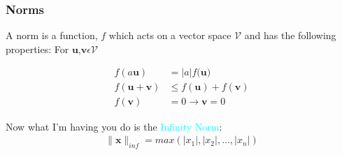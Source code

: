 \documentclass{beamer}
\begin{document}
\begin{frame}
\frametitle{Norms} 

A norm is a function, $f$ which acts on a vector space $\mathcal{V}$ and has the following properties: For $\textbf{u,v} \epsilon \mathcal{V} $

\begin{align*}
f(a \textbf{u}) &= |a| f(\textbf{u)}\\
f(\textbf{u} + \textbf{v}) &\leq f(\textbf{u}) + f(\textbf{v})\\
f(\textbf{v}) &= 0 \rightarrow \textbf{v} = 0
\end{align*}

Now what I'm having you do is the \textcolor{cyan}{Infinity Norm}:
\begin{align*}
\parallel \textbf{x}\parallel_{inf} = max(|x_1|,|x_2|, \ldots, |x_n|)
\end{align*}

\end{frame}

%
\end{document}
